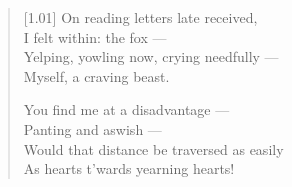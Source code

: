 \begin{verse}[1.01\textwidth]
  On reading letters late received,\\
  I felt within: the fox ---\\
  Yelping, yowling now, crying needfully ---\\
  Myself, a craving beast.

  You find me at a disadvantage ---\\
  Panting and aswish ---\\
  Would that distance be traversed as easily\\
  As hearts t'wards yearning hearts!
\end{verse}
